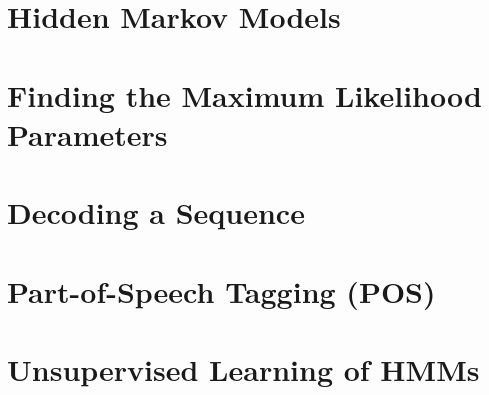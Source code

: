 \section{\label{hmm} Hidden Markov Models}






\section{\label{ml} Finding the Maximum Likelihood Parameters}




\section{\label{decoding} Decoding a Sequence}


\section{\label{pos-tagging} Part-of-Speech Tagging (POS)}


\section{\label{unsupervised} Unsupervised Learning of HMMs}





%

%


